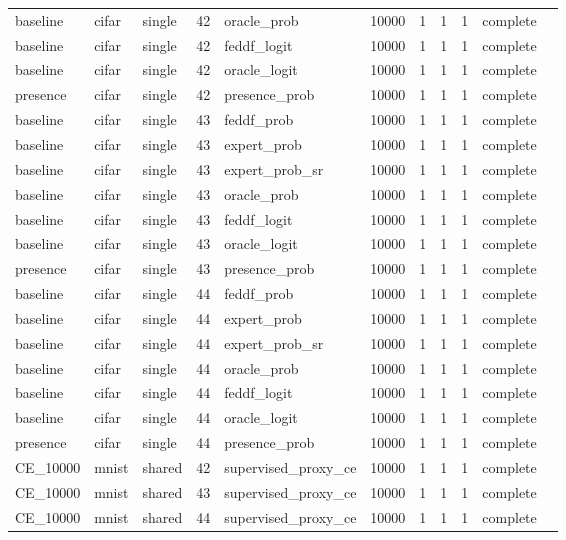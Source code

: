 \begin{tabular}{lllrlrrrrll}
baseline & cifar & single & 42 & oracle\_prob & 10000 & 1 & 1 & 1 & complete &  \\
baseline & cifar & single & 42 & feddf\_logit & 10000 & 1 & 1 & 1 & complete &  \\
baseline & cifar & single & 42 & oracle\_logit & 10000 & 1 & 1 & 1 & complete &  \\
presence & cifar & single & 42 & presence\_prob & 10000 & 1 & 1 & 1 & complete &  \\
baseline & cifar & single & 43 & feddf\_prob & 10000 & 1 & 1 & 1 & complete &  \\
baseline & cifar & single & 43 & expert\_prob & 10000 & 1 & 1 & 1 & complete &  \\
baseline & cifar & single & 43 & expert\_prob\_sr & 10000 & 1 & 1 & 1 & complete &  \\
baseline & cifar & single & 43 & oracle\_prob & 10000 & 1 & 1 & 1 & complete &  \\
baseline & cifar & single & 43 & feddf\_logit & 10000 & 1 & 1 & 1 & complete &  \\
baseline & cifar & single & 43 & oracle\_logit & 10000 & 1 & 1 & 1 & complete &  \\
presence & cifar & single & 43 & presence\_prob & 10000 & 1 & 1 & 1 & complete &  \\
baseline & cifar & single & 44 & feddf\_prob & 10000 & 1 & 1 & 1 & complete &  \\
baseline & cifar & single & 44 & expert\_prob & 10000 & 1 & 1 & 1 & complete &  \\
baseline & cifar & single & 44 & expert\_prob\_sr & 10000 & 1 & 1 & 1 & complete &  \\
baseline & cifar & single & 44 & oracle\_prob & 10000 & 1 & 1 & 1 & complete &  \\
baseline & cifar & single & 44 & feddf\_logit & 10000 & 1 & 1 & 1 & complete &  \\
baseline & cifar & single & 44 & oracle\_logit & 10000 & 1 & 1 & 1 & complete &  \\
presence & cifar & single & 44 & presence\_prob & 10000 & 1 & 1 & 1 & complete &  \\
CE\_10000 & mnist & shared & 42 & supervised\_proxy\_ce & 10000 & 1 & 1 & 1 & complete &  \\
CE\_10000 & mnist & shared & 43 & supervised\_proxy\_ce & 10000 & 1 & 1 & 1 & complete &  \\
CE\_10000 & mnist & shared & 44 & supervised\_proxy\_ce & 10000 & 1 & 1 & 1 & complete &  \\

\end{tabular}
